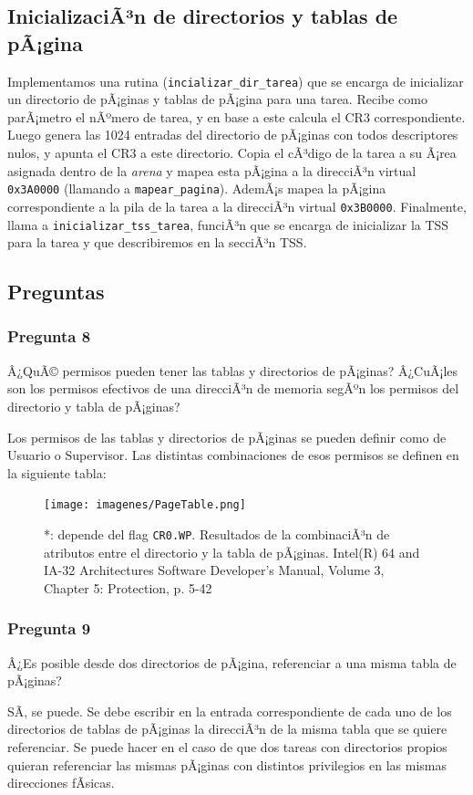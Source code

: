 \documentclass[10pt, a4paper]{article}
\begin{document}
\subsection{InicializaciÃ³n de directorios y tablas de pÃ¡gina}
Implementamos una rutina (\texttt{incializar\_dir\_tarea}) que se encarga de inicializar un directorio de pÃ¡ginas y tablas de pÃ¡gina para una tarea. 
Recibe como parÃ¡metro el nÃºmero de tarea, y en base a este calcula el CR3 correspondiente.
Luego genera las 1024 entradas del directorio de pÃ¡ginas con todos descriptores nulos, y apunta el CR3 a este directorio.
Copia
el cÃ³digo de la tarea a su Ã¡rea asignada dentro de la \emph{arena} y mapea esta pÃ¡gina a la direcciÃ³n virtual \texttt{0x3A0000} (llamando a \texttt{mapear\_pagina}). AdemÃ¡s mapea la pÃ¡gina correspondiente
a la pila de la tarea a la direcciÃ³n virtual \texttt{0x3B0000}.
Finalmente, llama a \texttt{inicializar\_tss\_tarea}, funciÃ³n que se encarga de inicializar la TSS para la tarea y que describiremos en la secciÃ³n TSS.
\subsection{Preguntas}
\subsubsection*{Pregunta 8}
 \begin{framed}
Â¿QuÃ© permisos pueden tener las tablas y directorios de pÃ¡ginas? Â¿CuÃ¡les son los permisos efectivos de una direcciÃ³n de memoria segÃºn los permisos del directorio
y tabla de pÃ¡ginas?
\end{framed}
Los permisos de las tablas y directorios de pÃ¡ginas se pueden definir como de Usuario o Supervisor. Las distintas combinaciones de esos permisos se definen en la siguiente tabla:

\begin{figure}[!h]
\begin{center}
\texttt{[image: imagenes/PageTable.png]}
\caption{*: depende del flag \texttt{CR0.WP}. Resultados de la combinaciÃ³n de atributos entre el directorio y la tabla de pÃ¡ginas. Intel(R) 64 and IA-32 Architectures Software Developer's Manual, Volume 3, Chapter 5: Protection, p. 5-42 }
\end{center}
\end{figure}
\subsubsection*{Pregunta 9}
 \begin{framed}
Â¿Es posible desde dos directorios de pÃ¡gina, referenciar a una misma tabla de pÃ¡ginas? 
\end{framed}
SÃ­, se puede. Se debe escribir en la entrada correspondiente de cada uno de los directorios de tablas de pÃ¡ginas la direcciÃ³n de la misma tabla que se quiere referenciar. Se puede hacer en el caso de que dos tareas
con directorios propios quieran referenciar las mismas pÃ¡ginas con distintos privilegios en las mismas direcciones fÃ­sicas.
\end{document}
